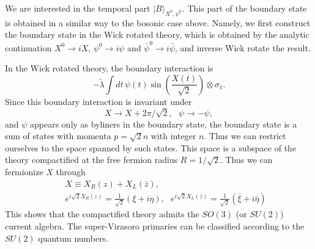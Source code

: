 \documentclass[a4paper,12pt]{article} \textheight=8.5truein
\begin{document}
We are interested in the temporal part $|B\rangle_{X^0,\psi^0}$.
This part of the boundary state is obtained in a similar way to
the bosonic case above. Namely, we first construct the boundary
state in the Wick rotated theory, which is obtained by the
analytic continuation $X^0\rightarrow iX$, $\psi^0\rightarrow
i\psi$ and $\bar\psi^0\rightarrow i\bar\psi$, and inverse Wick
rotate the result.

In the Wick rotated theory, the boundary interaction is
\begin{equation}
-\tilde{\lambda}\int dt\,
\psi(t)\sin\left(\frac{X(t)}{\sqrt{2}}\right) \otimes\sigma_1.
\end{equation}
Since this boundary interaction is invariant under
\begin{equation}
  X\rightarrow X+2\pi/\sqrt{2},~~~ \psi\rightarrow -\psi,
\end{equation}
and $\psi$ appears only as byliners in the boundary state, the
boundary state is a sum of states with momenta $p=\sqrt{2}n$ with
integer $n$. Thus we can restrict ourselves to the space spanned
by such states. This space is a subspace of the theory
compactified at the free fermion radius $R=1/\sqrt{2}$. Thus we
can fermionize $X$ through
\begin{eqnarray}
&&X\equiv X_R(z)+X_L(\bar{z}),\\
&&e^{i\sqrt{2}X_R(z)}=\frac{1}{\sqrt{2}} (\xi+i\eta),~~~
e^{i\sqrt{2}X_L(\bar{z})}=\frac{1}{\sqrt{2}} (\bar{\xi}+i\bar{\eta})
\end{eqnarray}
This shows that the compactified theory admits the $SO(3)$ (or
$SU(2)$) current algebra. The super-Virasoro primaries can be
classified according to the $SU(2)$ quantum numbers.
\end{document}
